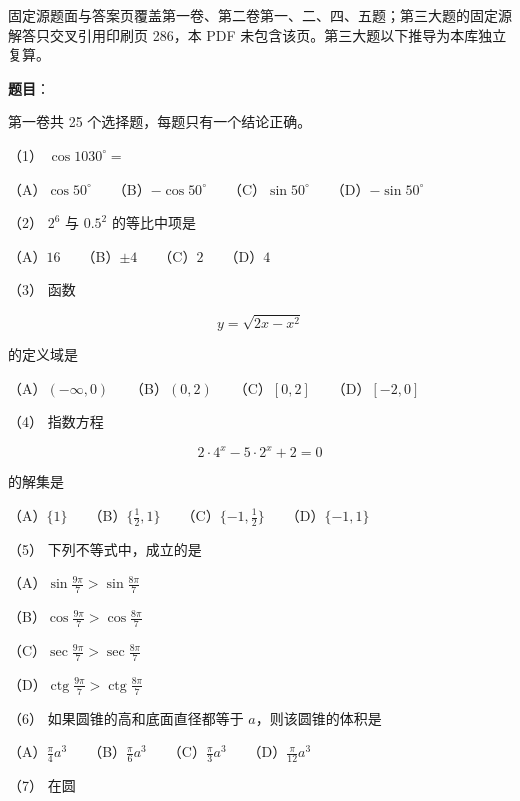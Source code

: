 

\begin{gktip}
固定源题面与答案页覆盖第一卷、第二卷第一、二、四、五题；第三大题的固定源解答只交叉引用印刷页 286，本 PDF 未包含该页。第三大题以下推导为本库独立复算。
\end{gktip}

\begin{answer}

\textbf{题目}：

第一卷共 25 个选择题，每题只有一个结论正确。

（1） $\cos1030^\circ=$

（A）$\cos50^\circ$　　（B）$-\cos50^\circ$　　（C）$\sin50^\circ$　　（D）$-\sin50^\circ$

（2） $2^6$ 与 $0.5^2$ 的等比中项是

（A）$16$　　（B）$\pm4$　　（C）$2$　　（D）$4$

（3） 函数

\nopagebreak[4]
\[
y=\sqrt{2x-x^2}
\]

的定义域是

（A）$(-\infty,0)$　　（B）$(0,2)$　　（C）$[0,2]$　　（D）$[-2,0]$

（4） 指数方程

\nopagebreak[4]
\[
2\cdot4^x-5\cdot2^x+2=0
\]

的解集是

（A）$\{1\}$　　（B）$\{\frac12,1\}$　　（C）$\{-1,\frac12\}$　　（D）$\{-1,1\}$

（5） 下列不等式中，成立的是

（A）$\displaystyle\sin\frac{9\pi}{7}>\sin\frac{8\pi}{7}$

（B）$\displaystyle\cos\frac{9\pi}{7}>\cos\frac{8\pi}{7}$

（C）$\displaystyle\sec\frac{9\pi}{7}>\sec\frac{8\pi}{7}$

（D）$\displaystyle\operatorname{ctg}\frac{9\pi}{7}>\operatorname{ctg}\frac{8\pi}{7}$

（6） 如果圆锥的高和底面直径都等于 $a$，则该圆锥的体积是

（A）$\frac\pi4a^3$　　（B）$\frac\pi6a^3$　　（C）$\frac\pi3a^3$　　（D）$\frac\pi{12}a^3$

（7） 在圆


\end{answer}
